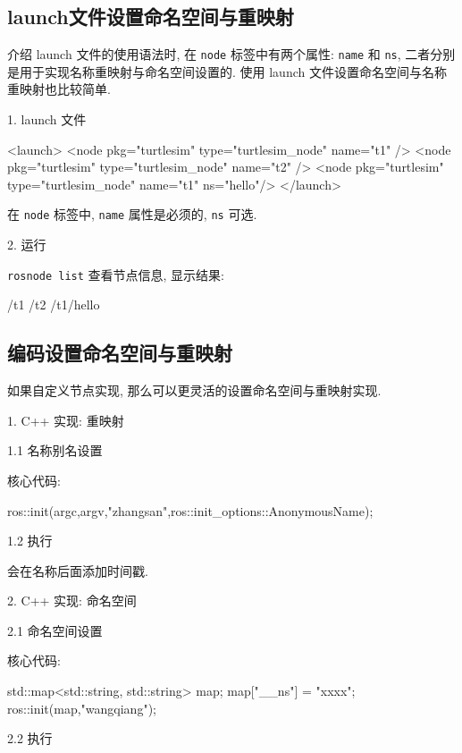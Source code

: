 \documentclass[openany, fontset=windowsold]{ctexbook}
\theoremstyle{kaiti}
\theoremstyle{normal}
\begin{document}
\subsection{launch文件设置命名空间与重映射}

介绍 launch 文件的使用语法时, 在 \verb|node| 标签中有两个属性: \verb|name| 和 \verb|ns|, 二者分别是用于实现名称重映射与命名空间设置的. 使用 launch 文件设置命名空间与名称重映射也比较简单.

1. launch 文件

\begin{xml}
  <launch>
      <node pkg="turtlesim" type="turtlesim_node" name="t1" />
      <node pkg="turtlesim" type="turtlesim_node" name="t2" />
      <node pkg="turtlesim" type="turtlesim_node" name="t1" ns="hello"/>
  </launch>
\end{xml}

在 \verb|node| 标签中, \verb|name| 属性是必须的, \verb|ns| 可选.

2. 运行

\verb|rosnode list| 查看节点信息, 显示结果:

\begin{bash}
  /t1
  /t2
  /t1/hello
\end{bash}

\subsection{编码设置命名空间与重映射}

如果自定义节点实现, 那么可以更灵活的设置命名空间与重映射实现.

1. C++ 实现: 重映射

1.1 名称别名设置

核心代码:

\begin{cpp}
  ros::init(argc,argv,"zhangsan",ros::init_options::AnonymousName);
\end{cpp}

1.2 执行

会在名称后面添加时间戳.

2. C++ 实现: 命名空间

2.1 命名空间设置

核心代码:

\begin{cpp}
  std::map<std::string, std::string> map;
  map["__ns"] = "xxxx";
  ros::init(map,"wangqiang");
\end{cpp}

2.2 执行
\end{document}
